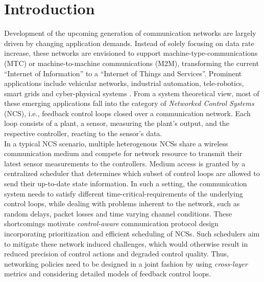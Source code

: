 \chapter{Introduction}


Development of the upcoming generation of communication networks are largely
driven by changing application demands. Instead of solely focusing on data rate
increase, these networks are envisioned to support machine-type-communications
(MTC) or machine-to-machine communications (M2M), transforming the current
``Internet of Information'' to a ``Internet of Things and Services''. Prominent
applications include vehicular networks, industrial automation, tele-robotics,
smart grids and cyber-physical systems \cite{murray2003future}. From a system
theoretical view, most of these emerging applications fall into the category of
\textit{Networked Control Systems} (NCS), i.e., feedback control loops closed
over a communication network. Each loop consists of a plant, a sensor, measuring
the plant's output, and the respective controller, reacting to the sensor's
data. \\
In a typical NCS scenario, multiple heterogenous NCSs share a wireless
communication medium and compete for network resource to transmit their latest
sensor measurements to the controllers. Medium access is granted by a
centralized scheduler that determines which subset of control loops are allowed
to send their up-to-date state information. In such a setting, the communication
system needs to satisfy different time-critical-requirements of the underlying
control loops, while dealing with problems inherent to the network, such as
random delays, packet losses and time varying channel conditions. These
shortcomings motivate \textit{control-aware} communication protocol design
incorporating prioritization and efficient scheduling of NCSs. Such schedulers
aim to mitigate these network induced challenges, which would otherwise result
in reduced precision of control actions and degraded control quality. Thus,
networking policies need to be designed in a joint fashion by using
\textit{cross-layer} metrics and considering detailed models of feedback control
loops. 

